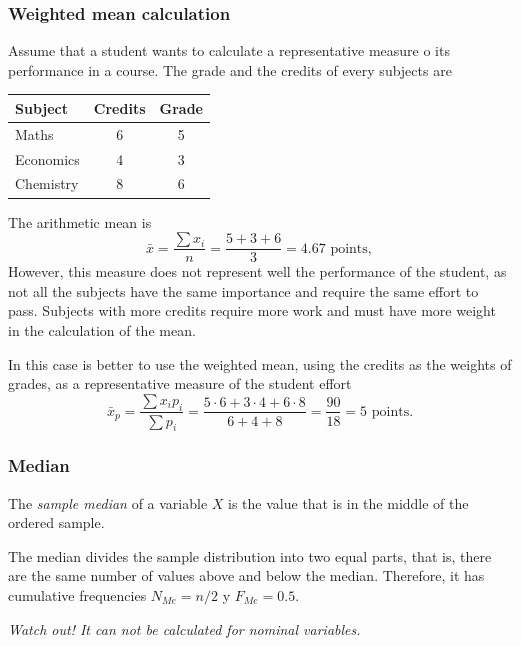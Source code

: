 \begin{frame}
\frametitle{Weighted mean calculation}
Assume that a student wants to calculate a representative measure o its performance in a course. 
The grade and the credits of every subjects are 
\begin{center}
\begin{tabular}{lcc}
\hline
Subject & Credits & Grade\\
\hline
Maths & 6 & 5 \\
Economics & 4 & 3 \\
Chemistry & 8 & 6 \\
\hline
\end{tabular}
\end{center}
The arithmetic mean is 
\[
\bar{x} = \frac{\sum x_i}{n} = \frac{5+3+6}{3}= 4.67 \text{ points},
\]
However, this measure does not represent well the performance of the student, as not all the subjects have the same
importance and require the same effort to pass. 
Subjects with more credits require more work and must have more weight in the calculation of the mean. 

In this case is better to use the weighted mean, using the credits as the
weights of grades, as a representative measure of the student effort
\[
\bar{x}_p = \frac{\sum x_ip_i}{\sum p_i} = \frac{5\cdot 6+3\cdot 4+6\cdot 8}{6+4+8}= \frac{90}{18} = 5 \text{ points}.
\]
\end{frame}


\begin{frame}
\frametitle{Median}
\begin{definition}
The \emph{sample median} of a variable $X$ is the value that is in the middle of the ordered sample. 
\end{definition}

The median divides the sample distribution into two equal parts, that is, there are the same number of values above and
below the median. Therefore, it has cumulative frequencies $N_{Me}= n/2$ y  $F_{Me}= 0.5$.

\begin{center}
\alert{\emph{Watch out! It can not be calculated for nominal variables.}}
\end{center}

\end{frame}


